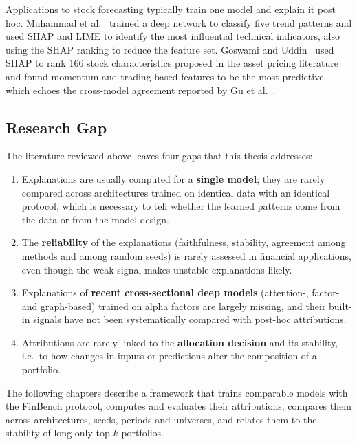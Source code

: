 Applications to stock forecasting typically train one model and explain it post hoc. Muhammad et al.~\cite{muhammad2024explainable} trained a deep network to classify five trend patterns and used SHAP and LIME to identify the most influential technical indicators, also using the SHAP ranking to reduce the feature set. Goswami and Uddin~\cite{goswami2026significance} used SHAP to rank 166 stock characteristics proposed in the asset pricing literature and found momentum and trading-based features to be the most predictive, which echoes the cross-model agreement reported by Gu et al.~\cite{gu2020empirical}.

\subsection{Research Gap}

The literature reviewed above leaves four gaps that this thesis addresses:
\begin{enumerate}[noitemsep]
    \item Explanations are usually computed for a \textbf{single model}; they are rarely compared across architectures trained on identical data with an identical protocol, which is necessary to tell whether the learned patterns come from the data or from the model design.
    \item The \textbf{reliability} of the explanations (faithfulness, stability, agreement among methods and among random seeds) is rarely assessed in financial applications, even though the weak signal makes unstable explanations likely.
    \item Explanations of \textbf{recent cross-sectional deep models} (attention-, factor- and graph-based) trained on alpha factors are largely missing, and their built-in signals have not been systematically compared with post-hoc attributions.
    \item Attributions are rarely linked to the \textbf{allocation decision} and its stability, i.e.\ to how changes in inputs or predictions alter the composition of a portfolio.
\end{enumerate}
The following chapters describe a framework that trains comparable models with the FinBench protocol, computes and evaluates their attributions, compares them across architectures, seeds, periods and universes, and relates them to the stability of long-only top-$k$ portfolios.
